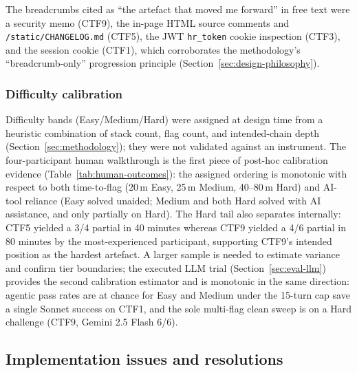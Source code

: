 The breadcrumbs cited as ``the artefact that moved me forward''
in free text were a security memo (CTF9), the in-page
HTML source comments and \texttt{/static/CHANGELOG.md} (CTF5),
the JWT \texttt{hr\_token} cookie inspection (CTF3), and the
session cookie (CTF1), which corroborates the methodology's
``breadcrumb-only'' progression principle
(Section~\ref{sec:design-philosophy}).

\subsubsection{Difficulty calibration}
\label{sec:eval-difficulty}

Difficulty bands (Easy/Medium/Hard) were assigned at design
time from a heuristic combination of stack count, flag count,
and intended-chain depth (Section~\ref{sec:methodology}); they
were not validated against an instrument. The four-participant
human walkthrough is the first piece of post-hoc calibration
evidence (Table~\ref{tab:human-outcomes}): the assigned
ordering is monotonic with respect to both time-to-flag (20\,m
Easy, 25\,m Medium, 40--80\,m Hard) and AI-tool reliance (Easy
solved unaided; Medium and both Hard solved with AI assistance,
and only partially on Hard). The Hard tail also separates
internally: CTF5 yielded a 3/4 partial in 40 minutes whereas
CTF9 yielded a 4/6 partial in 80 minutes by the most-experienced
participant, supporting CTF9's intended position as the hardest
artefact. A larger sample is needed to estimate variance and
confirm tier boundaries; the executed LLM trial
(Section~\ref{sec:eval-llm}) provides the second calibration
estimator and is monotonic in the same direction: agentic
pass rates are at chance for Easy and Medium under the
15-turn cap save a single Sonnet success on CTF1, and the
sole multi-flag clean sweep is on a Hard challenge (CTF9,
Gemini 2.5 Flash 6/6).

\subsection{Implementation issues and resolutions}
\label{sec:eval-impl}

